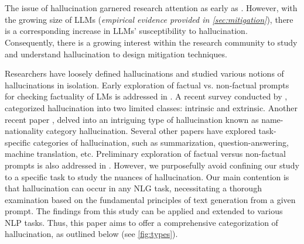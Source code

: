 \vspace{-3mm}
\section{}
\label{sec:cat_hallucination}
\vspace{-2mm}
The issue of hallucination garnered research attention as early as \cite{maynez-etal-2020-faithfulness}. However, with the growing size of LLMs (\emph{empirical evidence provided in \cref{sec:mitigation}}), there is a corresponding increase in LLMs' susceptibility to hallucination. Consequently, there is a growing interest within the research community to study and understand hallucination to design mitigation techniques.

Researchers have loosely defined hallucinations and studied various notions of hallucinations in isolation.  Early exploration of factual vs. non-factual prompts for checking factuality of LMs is addressed in \cite{NEURIPS2022_df438caa}. A recent survey conducted by \citep{maynez-etal-2020-faithfulness}, categorized hallucination into two limited classes: intrinsic and extrinsic. Another recent paper \citep{ladhak2023pre}, delved into an intriguing type of hallucination known as name-nationality %
category hallucination. Several other papers \cite{raunak-etal-2021-curious,maynez-etal-2020-faithfulness} have explored task-specific categories of hallucination, such as summarization, question-answering, machine translation, etc.  Preliminary exploration of factual versus non-factual prompts is also addressed in \cite{NEURIPS2022_df438caa}. However, we purposefully avoid confining our study to a specific task to study the nuances of hallucination. Our main contention is that hallucination can occur in any NLG task, necessitating a thorough examination based on the fundamental principles of text generation from a given prompt. The findings from this study can be applied and extended to various NLP tasks. Thus, this paper aims to offer a comprehensive categorization of hallucination, as outlined below (see \cref{fig:types}).

